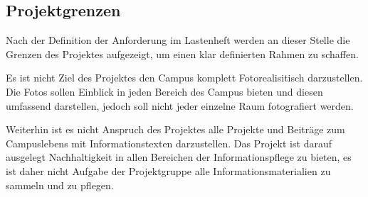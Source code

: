 \subsection{Projektgrenzen}
\label{sec:Projektgrenzen}

Nach der Definition der Anforderung im Lastenheft werden an dieser Stelle die Grenzen des Projektes aufgezeigt, um einen klar definierten Rahmen zu schaffen.

Es ist nicht Ziel des Projektes den Campus komplett Fotorealisitisch darzustellen. Die Fotos sollen Einblick in jeden Bereich des Campus bieten und diesen umfassend darstellen, jedoch soll nicht jeder einzelne Raum fotografiert werden.

Weiterhin ist es nicht Anspruch des Projektes alle Projekte und Beiträge zum Campuslebens mit Informationstexten darzustellen. Das Projekt ist darauf ausgelegt Nachhaltigkeit in allen Bereichen der Informationspflege zu bieten, es ist daher nicht Aufgabe der Projektgruppe alle Informationsmaterialien zu sammeln und zu pflegen.